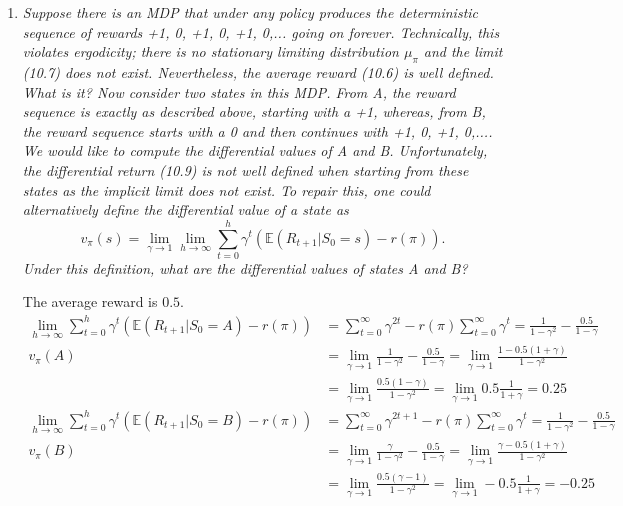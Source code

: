 \documentclass[12pt,a4paper]{article}
\begin{document}
\begin{enumerate}
  \item \textit{Suppose there is an MDP that under any policy produces the deterministic
  sequence of rewards +1, 0, +1, 0, +1, 0,... going on forever. Technically, this violates
  ergodicity; there is no stationary limiting distribution $\mu_\pi$ and the limit (10.7) does not
  exist. Nevertheless, the average reward (10.6) is well defined. What is it? Now consider
  two states in this MDP. From A, the reward sequence is exactly as described above,
  starting with a +1, whereas, from B, the reward sequence starts with a 0 and then
  continues with +1, 0, +1, 0,.... We would like to compute the differential values of A and
  B. Unfortunately, the differential return (10.9) is not well defined when starting from
  these states as the implicit limit does not exist. To repair this, one could alternatively
  define the differential value of a state as
  \[ v_\pi (s) = \lim\limits_{\gamma \rightarrow 1} \lim\limits_{h \rightarrow \infty}
  \sum\limits_{t = 0}^h \gamma^t(\mathbb{E}(R_{t + 1} | S_0 = s) - r(\pi)).
  \]
  Under this definition, what are the differential values of states A and B?}

  The average reward is $0.5$.
  \begin{align*}
    \lim\limits_{h \rightarrow \infty}
    \sum\limits_{t = 0}^h \gamma^t(\mathbb{E}(R_{t + 1} | S_0 = A) - r(\pi))
    &= \sum\limits_{t = 0}^\infty \gamma^{2t} - r(\pi) \sum\limits_{t = 0}^\infty \gamma^t
    = \frac{1}{1 - \gamma^2} - \frac{0.5}{1 - \gamma}\\
    v_\pi(A) &= \lim\limits_{\gamma \rightarrow 1} \frac{1}{1 - \gamma^2} - \frac{0.5}{1 - \gamma}
    = \lim\limits_{\gamma \rightarrow 1} \frac{1 - 0.5(1 + \gamma)}{1 - \gamma^2}\\
    &= \lim\limits_{\gamma \rightarrow 1} \frac{0.5(1 - \gamma)}{1 - \gamma^2}
    = \lim\limits_{\gamma \rightarrow 1} 0.5 \frac{1}{1 + \gamma } = 0.25\\
    \lim\limits_{h \rightarrow \infty}
    \sum\limits_{t = 0}^h \gamma^t(\mathbb{E}(R_{t + 1} | S_0 = B) - r(\pi))
    &= \sum\limits_{t = 0}^\infty \gamma^{2t + 1} - r(\pi) \sum\limits_{t = 0}^\infty \gamma^t
    = \frac{1}{1 - \gamma^2} - \frac{0.5}{1 - \gamma}\\
    v_\pi(B) &= \lim\limits_{\gamma \rightarrow 1} \frac{\gamma}{1 - \gamma^2} - \frac{0.5}{1 - \gamma}
    = \lim\limits_{\gamma \rightarrow 1} \frac{\gamma - 0.5(1 + \gamma)}{1 - \gamma^2}\\
    &= \lim\limits_{\gamma \rightarrow 1} \frac{0.5(\gamma - 1)}{1 - \gamma^2}
    = \lim\limits_{\gamma \rightarrow 1} -0.5\frac{1}{1 + \gamma} = -0.25
  \end{align*}


\end{enumerate}
\end{document}
